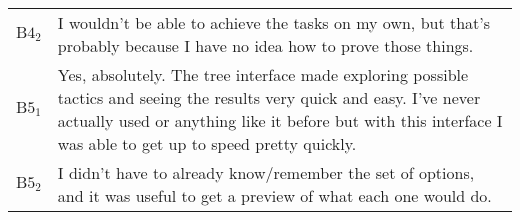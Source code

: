 \begin{tabularx}{\linewidth}{@{}cX@{}}
  $\text{B}4_{2}$ & I wouldn't be able to achieve the tasks on my own, but that's probably because I have no idea how to prove those things. \\
  $\text{B}5_{1}$ & Yes, absolutely.  The tree interface made exploring possible tactics and seeing the results very quick and easy.  I've never actually used \Coq{} or anything like it before but with this interface I was able to get up to speed pretty quickly. \\
  $\text{B}5_{2}$ & I didn't have to already know/remember the set of options, and it was useful to get a preview of what each one would do. \\
  \bottomrule
\end{tabularx}{\parfillskip=0pt\par}

\clearpage

